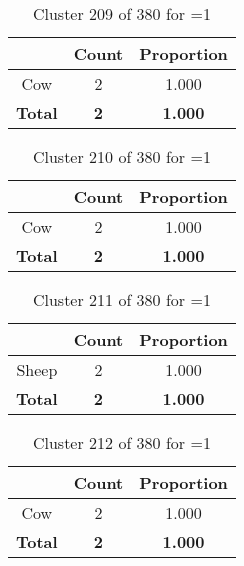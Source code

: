\begin{table}[ht!]
\centering
\begin{tabular}{|c|c|c|}
\hline
\bf \Spec{} &\bf Count &\bf Proportion\\ \hline \hline
Cow & 2 & 1.000\\ \hline
\hline
\bf Total & \bf 2 & \bf 1.000\\ \hline
\end{tabular}
\label{tab:cluster:209:1}
\caption{Cluster 209 of 380 for \minneigh{}=1}
\end{table}

\clearpage
\begin{table}[ht!]
\centering
\begin{tabular}{|c|c|c|}
\hline
\bf \Spec{} &\bf Count &\bf Proportion\\ \hline \hline
Cow & 2 & 1.000\\ \hline
\hline
\bf Total & \bf 2 & \bf 1.000\\ \hline
\end{tabular}
\label{tab:cluster:210:1}
\caption{Cluster 210 of 380 for \minneigh{}=1}
\end{table}

\begin{table}[ht!]
\centering
\begin{tabular}{|c|c|c|}
\hline
\bf \Spec{} &\bf Count &\bf Proportion\\ \hline \hline
Sheep & 2 & 1.000\\ \hline
\hline
\bf Total & \bf 2 & \bf 1.000\\ \hline
\end{tabular}
\label{tab:cluster:211:1}
\caption{Cluster 211 of 380 for \minneigh{}=1}
\end{table}

\begin{table}[ht!]
\centering
\begin{tabular}{|c|c|c|}
\hline
\bf \Spec{} &\bf Count &\bf Proportion\\ \hline \hline
Cow & 2 & 1.000\\ \hline
\hline
\bf Total & \bf 2 & \bf 1.000\\ \hline
\end{tabular}
\label{tab:cluster:212:1}
\caption{Cluster 212 of 380 for \minneigh{}=1}
\end{table}

